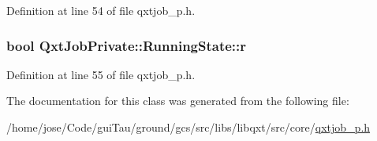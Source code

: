 Definition at line 54 of file qxtjob\-\_\-p.\-h.

\hypertarget{class_qxt_job_private_1_1_running_state_a57199a26b30bc87fd316b94a1e5de235}{
\subsubsection[{r}]{\setlength{\rightskip}{0pt plus 5cm}bool Qxt\-Job\-Private\-::\-Running\-State\-::r}}\label{class_qxt_job_private_1_1_running_state_a57199a26b30bc87fd316b94a1e5de235}


Definition at line 55 of file qxtjob\-\_\-p.\-h.



The documentation for this class was generated from the following file\-:\begin{DoxyCompactItemize}
\item 
/home/jose/\-Code/gui\-Tau/ground/gcs/src/libs/libqxt/src/core/\hyperlink{qxtjob__p_8h}{qxtjob\-\_\-p.\-h}\end{DoxyCompactItemize}
